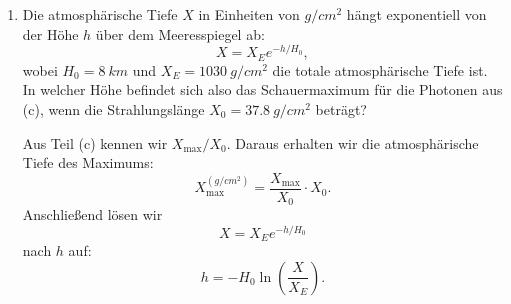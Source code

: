 \documentclass[11pt,a4paper]{scrartcl}
\begin{document}
\begin{enumerate}[label=(\alph*)]
\begin{calculationbox}
                \begin{calculationbox}
                    Die kritische Energie wird physikalisch dadurch bestimmt, daß bei dieser
                    Energie die dominierenden Verlustmechanismen wechseln. Für Elektronen und
                    Positronen ist $E_c$ näherungsweise die Energie, bei der Strahlungsverluste
                    durch Bremsstrahlung und kontinuierliche Energieverluste, vor allem durch
                    Ionisation und Anregung des Mediums, vergleichbar groß werden. Unterhalb
                    von $E_c$ ist die weitere Teilchenproduktion ineffizient.
                \end{calculationbox}
            \end{calculationbox}

            \begin{answerbox}
                Für $10^{11}\,\si{eV}$ erhält man
                \[
                    \boxed{\frac{X_{\max}}{X_0}=10.22,\qquad \frac{L}{X_0}=15.33.}
                \]
                Für $10^{16}\,\si{eV}$ erhält man
                \[
                    \boxed{\frac{X_{\max}}{X_0}=26.83,\qquad \frac{L}{X_0}=40.24.}
                \]
            \end{answerbox}

        \item
            Die atmosphärische Tiefe $X$ in Einheiten von $\si{g/cm^2}$ hängt exponentiell
            von der Höhe $h$ über dem Meeresspiegel ab:
            \[
                X=X_Ee^{-h/H_0},
            \]
            wobei $H_0=\SI{8}{km}$ und $X_E=\SI{1030}{g/cm^2}$ die totale atmosphärische
            Tiefe ist. In welcher Höhe befindet sich also das Schauermaximum für die Photonen
            aus (c), wenn die Strahlungslänge $X_0=\SI{37.8}{g/cm^2}$ beträgt?

            \begin{calculationbox}
                Aus Teil (c) kennen wir $X_{\max}/X_0$. Daraus erhalten wir die atmosphärische
                Tiefe des Maximums:
                \[
                    X_{\max}^{(\si{g/cm^2})}=\frac{X_{\max}}{X_0}\cdot X_0.
                \]
                Anschließend lösen wir
                \[
                    X=X_Ee^{-h/H_0}
                \]
                nach $h$ auf:
                \[
                    h=-H_0\ln\left(\frac{X}{X_E}\right).
                \]


\end{calculationbox}
\end{enumerate}
\end{document}

